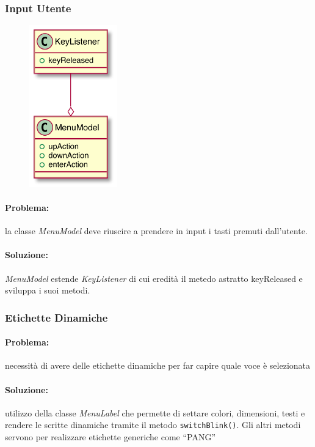 \documentclass[a4paper,12pt]{report}
\begin{document}
\subsubsection{Input Utente}
    \begin{figure}[H]
    \centering
    \includegraphics[height=7cm]{img/ez/2.png}
\end{figure}

\paragraph{Problema:} la classe \emph{MenuModel} deve riuscire a prendere in input i tasti premuti dall’utente.

\paragraph{Soluzione:} \emph{MenuModel} estende \emph{KeyListener} di cui eredità il metedo astratto keyReleased e sviluppa i suoi metodi.

\subsubsection{Etichette Dinamiche}
\paragraph{Problema:} necessità di avere delle etichette dinamiche per far capire quale voce è selezionata

\paragraph{Soluzione:} utilizzo della classe \emph{MenuLabel} che permette di settare colori, dimensioni, testi e rendere le scritte dinamiche tramite il metodo \texttt{switchBlink()}.
Gli altri metodi servono per realizzare etichette generiche come “PANG”
\end{document}
